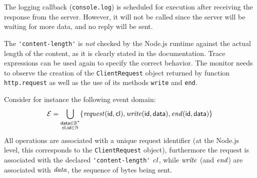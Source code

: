 The logging callback (\lstinline{console.log}) is scheduled for execution after receiving the response from the server.
However, it will not be called since the server will be waiting for more data, and no reply will be sent.

The \lstinline{'content-length'} is \emph{not} checked by the Node.js runtime against the actual length of the content, as it is clearly stated in the documentation.
Trace expressions can be used again to specify the correct behavior.
The monitor needs to observe the creation of the \lstinline{ClientRequest} object returned by function \lstinline{http.request} as well as the use of its methods \lstinline{write} and \lstinline{end}.

Consider for instance the following event domain:
\[ \mathcal{E} = \bigcup_{\substack{\mathsf{data} \in \mathbb{B}^* \\ \mathsf{cl},\mathsf{id} \in \mathbb{N}}} \{ \mathit{request}(\mathsf{id},\mathsf{cl}), \mathit{write}(\mathsf{id}, \mathsf{data}), \mathit{end}(\mathsf{id}, \mathsf{data}) \} \]
All operations are associated with a unique request identifier (at the Node.js level, this corresponds to the \lstinline{ClientRequest} object), furthermore the request is associated with the declared \lstinline{'content-length'} \(\mathit{cl}\), while \(\mathit{write}\) (and \(\mathit{end}\)) are associated with \(\mathit{data}\),
the sequence of bytes being sent.




